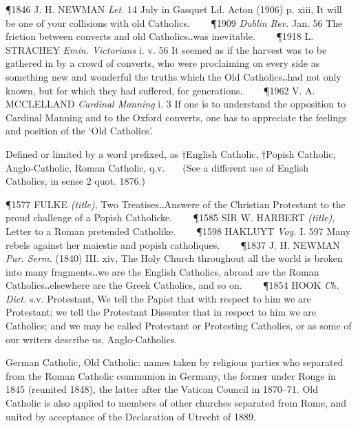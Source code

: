 \begin{description}[wide, labelwidth=!, labelindent=0pt]
\begin{myenumerate}
\P 1846 J. H. NEWMAN  \textit{Let.} 14 July in Gasquet Ld. Acton (1906) p. xiii, It will be one of your collisions with old Catholics.    
\P 1909 \textit{Dublin  Rev.} Jan. 56 The friction between converts and old Catholics‥was inevitable.    
\P 1918 L. STRACHEY  \textit{Emin. Victorians} i. v. 56 It seemed as if the harvest was to be gathered in by a crowd of converts, who were proclaiming on every side as something new and wonderful the truths which the Old Catholics‥had not only known, but for which they had suffered, for generations.    
\P 1962 V. A. MCCLELLAND  \textit{Cardinal Manning} i. 3 If one is to understand the opposition to Cardinal Manning and to the Oxford converts, one has to appreciate the feelings and position of the ‘Old Catholics’.

 Defined or limited by a word prefixed, as †English Catholic, †Popish Catholic, Anglo-Catholic, Roman Catholic, q.v.
   (See a different use of English Catholics, in sense 2 quot. 1876.)

\P 1577 FULKE  \textit{(title)}, Two Treatises‥Answere of the Christian Protestant to the proud challenge of a Popish Catholicke.    
\P 1585 SIR W. HARBERT  \textit{(title)}, Letter to a Roman pretended Catholike.    
\P 1598 HAKLUYT  \textit{Voy.} I. 597 Many rebels against her maiestie and popish catholiques.    
\P 1837 J. H. NEWMAN  \textit{Par. Serm.} (1840) III. xiv, The Holy Church throughout all the world is broken into many fragments‥we are the English Catholics, abroad are the Roman Catholics‥elsewhere are the Greek Catholics, and so on.    
\P 1854 HOOK  \textit{Ch. Dict.} s.v. Protestant, We tell the Papist that with respect to him we are Protestant; we tell the Protestant Dissenter that in respect to him we are Catholics; and we may be called Protestant or Protesting Catholics, or as some of our writers describe us, Anglo-Catholics.

 German Catholic, Old Catholic: names taken by religious parties who separated from the Roman Catholic communion in Germany, the former under Ronge in 1845 (reunited 1848), the latter after the Vatican Council in 1870–71. Old Catholic is also applied to members of other churches separated from Rome, and united by acceptance of the Declaration of Utrecht of 1889. 


\end{myenumerate}
\end{description}

